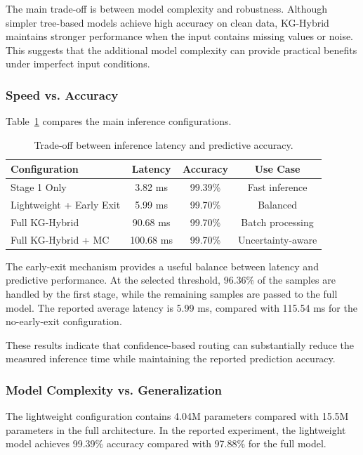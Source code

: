 \documentclass[journal]{IEEEtran}
\begin{document}
The main trade-off is between model complexity and robustness. Although simpler tree-based models achieve high accuracy on clean data, KG-Hybrid maintains stronger performance when the input contains missing values or noise. This suggests that the additional model complexity can provide practical benefits under imperfect input conditions.


\subsubsection{Speed vs. Accuracy}

Table~\ref{tab:speed_accuracy_tradeoff} compares the main inference configurations.

\begin{table}[t]
\centering
\caption{Trade-off between inference latency and predictive accuracy.}
\label{tab:speed_accuracy_tradeoff}
\begin{tabular}{lccc}
\hline
\textbf{Configuration} & \textbf{Latency} & \textbf{Accuracy} & \textbf{Use Case} \\
\hline
Stage 1 Only & 3.82 ms & 99.39\% & Fast inference \\
Lightweight + Early Exit & 5.99 ms & 99.70\% & Balanced \\
Full KG-Hybrid & 90.68 ms & 99.70\% & Batch processing \\
Full KG-Hybrid + MC & 100.68 ms & 99.70\% & Uncertainty-aware \\
\hline
\end{tabular}
\end{table}

The early-exit mechanism provides a useful balance between latency and predictive performance. At the selected threshold, 96.36\% of the samples are handled by the first stage, while the remaining samples are passed to the full model. The reported average latency is 5.99 ms, compared with 115.54 ms for the no-early-exit configuration.

These results indicate that confidence-based routing can substantially reduce the measured inference time while maintaining the reported prediction accuracy.


\subsubsection{Model Complexity vs. Generalization}

The lightweight configuration contains 4.04M parameters compared with 15.5M parameters in the full architecture. In the reported experiment, the lightweight model achieves 99.39\% accuracy compared with 97.88\% for the full model.
\end{document}
